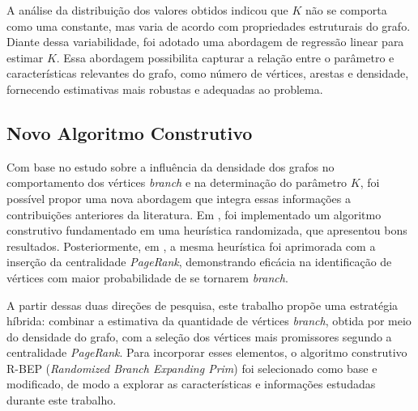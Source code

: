 A análise da distribuição dos valores obtidos indicou que $K$ não se comporta como uma constante, mas varia de acordo com propriedades estruturais do grafo. Diante dessa variabilidade, foi adotado uma abordagem de regressão linear \citep{seber2003linear} para estimar $K$. Essa abordagem possibilita capturar a relação entre o parâmetro e características relevantes do grafo, como número de vértices, arestas e densidade, fornecendo estimativas mais robustas e adequadas ao problema.


\subsection{Novo Algoritmo Construtivo}

Com base no estudo sobre a influência da densidade dos grafos no comportamento dos vértices \textit{branch} e na determinação do parâmetro $K$, foi possível propor uma nova abordagem que integra essas informações a contribuições anteriores da literatura. Em \cite{oliveira:2023}, foi implementado um algoritmo construtivo fundamentado em uma heurística randomizada, que apresentou bons resultados. Posteriormente, em \cite{silva2024ils}, a mesma heurística foi aprimorada com a inserção da centralidade \textit{PageRank}, demonstrando eficácia na identificação de vértices com maior probabilidade de se tornarem \textit{branch}.

A partir dessas duas direções de pesquisa, este trabalho propõe uma estratégia híbrida: combinar a estimativa da quantidade de vértices \textit{branch}, obtida por meio do densidade do grafo, com a seleção dos vértices mais promissores segundo a centralidade \textit{PageRank}. Para incorporar esses elementos, o algoritmo construtivo R-BEP (\textit{Randomized Branch Expanding Prim}) foi selecionado como base e modificado, de modo a explorar as características e informações estudadas durante este trabalho.

